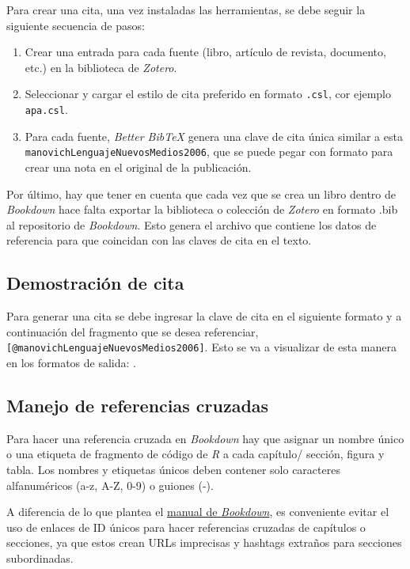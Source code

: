 \documentclass[
]{book}
\begin{document}
Para crear una cita, una vez instaladas las herramientas, se debe seguir la siguiente secuencia de pasos:

\begin{enumerate}
\def\labelenumi{\arabic{enumi}.}
\item
  Crear una entrada para cada fuente (libro, artículo de revista, documento, etc.) en la biblioteca de \emph{Zotero}.
\item
  Seleccionar y cargar el estilo de cita preferido en formato \texttt{.csl}, cor ejemplo \texttt{apa.csl}.
\item
  Para cada fuente, \emph{Better BibTeX} genera una clave de cita única similar a esta \texttt{manovichLenguajeNuevosMedios2006}, que se puede pegar con formato para crear una nota en el original de la publicación.
\end{enumerate}

Por último, hay que tener en cuenta que cada vez que se crea un libro dentro de \emph{Bookdown} hace falta exportar la biblioteca o colección de \emph{Zotero} en formato .bib al repositorio de \emph{Bookdown}. Esto genera el archivo que contiene los datos de referencia para que coincidan con las claves de cita en el texto.

\hypertarget{demostraciuxf3n-de-cita}{%
\subsection{Demostración de cita}\label{demostraciuxf3n-de-cita}}

Para generar una cita se debe ingresar la clave de cita en el siguiente formato y a continuación del fragmento que se desea referenciar, \texttt{{[}@manovichLenguajeNuevosMedios2006{]}}. Esto se va a visualizar de esta manera en los formatos de salida: \citep{manovichLenguajeNuevosMedios2006}.

\hypertarget{manejo-de-referencias-cruzadas}{%
\subsection{Manejo de referencias cruzadas}\label{manejo-de-referencias-cruzadas}}

Para hacer una referencia cruzada en \emph{Bookdown} hay que asignar un nombre único o una etiqueta de fragmento de código de \emph{R} a cada capítulo/ sección, figura y tabla. Los nombres y etiquetas únicos deben contener solo caracteres alfanuméricos (a-z, A-Z, 0-9) o guiones (-).

A diferencia de lo que plantea el \href{https://bookdown.org/yihui/bookdown/cross-references.html}{manual de \emph{Bookdown}}, es conveniente evitar el uso de enlaces de ID únicos para hacer referencias cruzadas de capítulos o secciones, ya que estos crean URLs imprecisas y hashtags extraños para secciones subordinadas.
\end{document}
